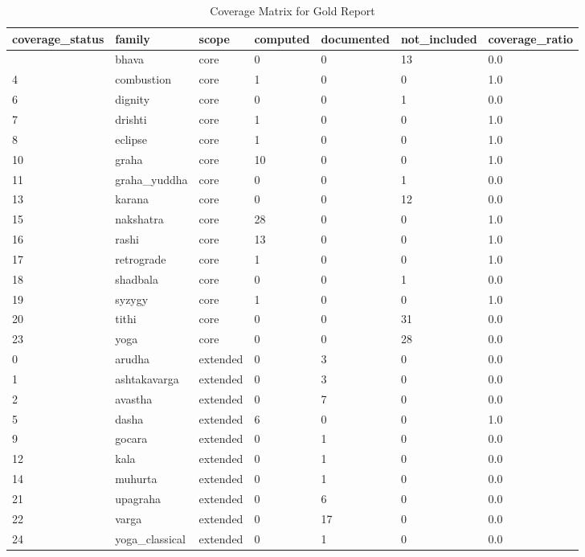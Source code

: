 \documentclass[
  11pt,
  a4paper,
  oneside,
  openany]{article}
\begin{document}
\begin{longtable}[]{@{}lllllll@{}}

\caption{\label{tbl-gold-vedic-coverage}Coverage Matrix for Gold Report}

\tabularnewline

\toprule\noalign{}
coverage\_status & family & scope & computed & documented &
not\_included & coverage\_ratio \\
\midrule\noalign{}
\endhead
\bottomrule\noalign{}
\endlastfoot
3 & bhava & core & 0 & 0 & 13 & 0.0 \\
4 & combustion & core & 1 & 0 & 0 & 1.0 \\
6 & dignity & core & 0 & 0 & 1 & 0.0 \\
7 & drishti & core & 1 & 0 & 0 & 1.0 \\
8 & eclipse & core & 1 & 0 & 0 & 1.0 \\
10 & graha & core & 10 & 0 & 0 & 1.0 \\
11 & graha\_yuddha & core & 0 & 0 & 1 & 0.0 \\
13 & karana & core & 0 & 0 & 12 & 0.0 \\
15 & nakshatra & core & 28 & 0 & 0 & 1.0 \\
16 & rashi & core & 13 & 0 & 0 & 1.0 \\
17 & retrograde & core & 1 & 0 & 0 & 1.0 \\
18 & shadbala & core & 0 & 0 & 1 & 0.0 \\
19 & syzygy & core & 1 & 0 & 0 & 1.0 \\
20 & tithi & core & 0 & 0 & 31 & 0.0 \\
23 & yoga & core & 0 & 0 & 28 & 0.0 \\
0 & arudha & extended & 0 & 3 & 0 & 0.0 \\
1 & ashtakavarga & extended & 0 & 3 & 0 & 0.0 \\
2 & avastha & extended & 0 & 7 & 0 & 0.0 \\
5 & dasha & extended & 6 & 0 & 0 & 1.0 \\
9 & gocara & extended & 0 & 1 & 0 & 0.0 \\
12 & kala & extended & 0 & 1 & 0 & 0.0 \\
14 & muhurta & extended & 0 & 1 & 0 & 0.0 \\
21 & upagraha & extended & 0 & 6 & 0 & 0.0 \\
22 & varga & extended & 0 & 17 & 0 & 0.0 \\
24 & yoga\_classical & extended & 0 & 1 & 0 & 0.0 \\

\end{longtable}
\end{document}
